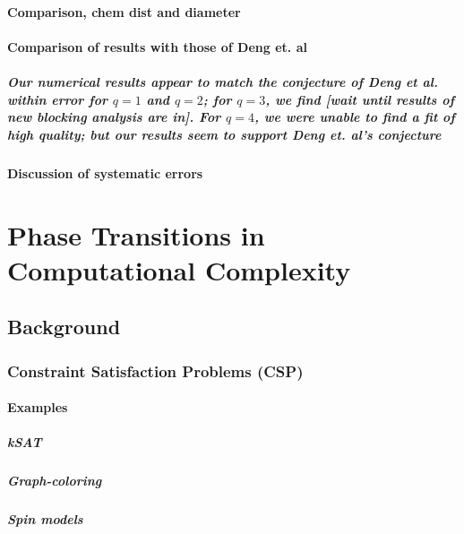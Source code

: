 \documentclass{umthesis}
\begin{document}
\subsubsection{Comparison, chem dist and diameter}
\label{sec-3.2.7.1}
\subsubsection{Comparison of results with those of Deng et. al}
\label{sec-3.2.7.2}
\paragraph{Our numerical results appear to match the conjecture of Deng et al. \cite{Deng2010} within error for $q=1$ and $q=2$; for $q=3$, we find [wait until results of new blocking analysis are in].  For $q=4$, we were unable to find a fit of high quality; but our results seem to support Deng et. al's conjecture}
\label{sec-3.2.7.2.1}
\subsubsection{Discussion of systematic errors}
\label{sec-3.2.7.3}
\chapter{Phase Transitions in Computational Complexity}
\label{sec-4}
\section{Background}
\label{sec-4.1}
\subsection{Constraint Satisfaction Problems (CSP)}
\label{sec-4.1.1}
\subsubsection{Examples}
\label{sec-4.1.1.1}
\paragraph{kSAT}
\label{sec-4.1.1.1.1}
\paragraph{Graph-coloring}
\label{sec-4.1.1.1.2}
\paragraph{Spin models}
\label{sec-4.1.1.1.3}
\end{document}
